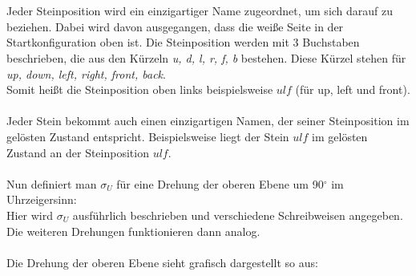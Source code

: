 \documentclass[12pt,a4paper, usenames, dvipsnames]{article}
\begin{document}
\ \\
\\
Jeder Steinposition wird ein einzigartiger Name zugeordnet, um sich darauf zu beziehen. Dabei wird davon ausgegangen, dass die weiße Seite in der Startkonfiguration oben ist. Die Steinposition werden mit 3 Buchstaben beschrieben, die aus den Kürzeln \textit{u, d, l, r, f, b} bestehen. Diese Kürzel stehen für \textit{up, down, left, right, front, back}. \\
Somit heißt die Steinposition oben links beispielsweise $ulf$ (für up, left und front). 
\\
\\
Jeder Stein bekommt auch einen einzigartigen Namen, der seiner Steinposition im gelösten Zustand entspricht. Beispielsweise liegt der Stein $ulf$ im gelösten Zustand an der Steinposition $ulf$.
\\ 
\\
Nun definiert man $\sigma_U$ für eine Drehung der oberen Ebene um 90$^\circ$ im Uhrzeigersinn: \\
Hier wird $\sigma_U$ ausführlich beschrieben und verschiedene Schreibweisen angegeben. Die weiteren Drehungen funktionieren dann analog. \\
\\
Die Drehung der oberen Ebene sieht grafisch dargestellt so aus: \\
\end{document}
